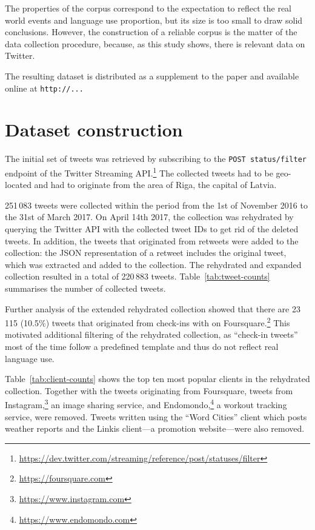 \documentclass[11pt,a4paper]{article}
\begin{document}
The properties of the corpus correspond to the expectation to reflect the real world events and language use proportion, but its size is too small to draw solid conclusions. However, the construction of a reliable corpus is the matter of the data collection procedure, because, as this study shows, there is relevant data on Twitter.

The resulting dataset is distributed as a supplement to the paper and available online at \texttt{http://...}

\section{Dataset construction}
\label{sec:construction}

The initial set of tweets was retrieved by subscribing to the \texttt{POST status/filter} endpoint of the Twitter Streaming API.\footnote{\url{https://dev.twitter.com/streaming/reference/post/statuses/filter}}
The collected tweets had to be geo-located and had to originate from the area of Riga, the capital of Latvia.\footnotemark{}


251\,083 tweets were collected within the period from the 1st of November 2016 to the 31st of March 2017. On April 14th 2017, the collection was rehydrated by querying the Twitter API with the collected tweet IDs to get rid of the deleted tweets. In addition, the tweets that originated from retweets were added to the collection: the JSON representation of a retweet includes the original tweet, which was extracted and added to the collection. The rehydrated and expanded collection resulted in a total of 220\,883 tweets. Table~\ref{tab:tweet-counts} summarises the number of collected tweets.



Further analysis of the extended rehydrated collection showed that there are 23\,115 (10.5\%) tweets that originated from check-ins with on Foursquare.\footnote{\url{https://foursquare.com}} This motivated additional filtering of the rehydrated collection, as ``check-in tweets'' most of the time follow a predefined template and thus do not reflect real language use. %



Table~\ref{tab:client-counts} shows the top ten most popular clients in the rehydrated collection. Together with the tweets originating from Foursquare, tweets from Instagram,\footnote{\url{https://www.instagram.com}} an image sharing service, and Endomondo,\footnote{\url{https://www.endomondo.com}} a workout tracking service, were removed. Tweets written using the ``Word Cities'' client which posts weather reports and the Linkis client---a promotion website---were also removed.
\end{document}
